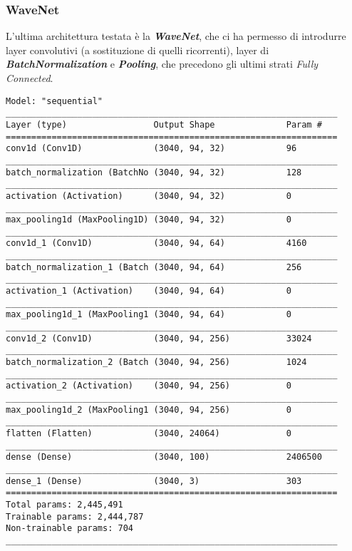 \subsubsection*{WaveNet}
L'ultima architettura testata è la \textit{\textbf{WaveNet}}\cite{DBLP:journals/corr/OordDZSVGKSK16}, che ci ha permesso di introdurre layer convolutivi (a sostituzione di quelli ricorrenti), layer di \textit{\textbf{BatchNormalization}} e \textit{\textbf{Pooling}}, che precedono gli ultimi strati \textit{Fully Connected}.
\begin{lstlisting}[style=arch]
Model: "sequential"
_________________________________________________________________
Layer (type)                 Output Shape              Param #   
=================================================================
conv1d (Conv1D)              (3040, 94, 32)            96        
_________________________________________________________________
batch_normalization (BatchNo (3040, 94, 32)            128       
_________________________________________________________________
activation (Activation)      (3040, 94, 32)            0         
_________________________________________________________________
max_pooling1d (MaxPooling1D) (3040, 94, 32)            0         
_________________________________________________________________
conv1d_1 (Conv1D)            (3040, 94, 64)            4160      
_________________________________________________________________
batch_normalization_1 (Batch (3040, 94, 64)            256       
_________________________________________________________________
activation_1 (Activation)    (3040, 94, 64)            0         
_________________________________________________________________
max_pooling1d_1 (MaxPooling1 (3040, 94, 64)            0         
_________________________________________________________________
conv1d_2 (Conv1D)            (3040, 94, 256)           33024     
_________________________________________________________________
batch_normalization_2 (Batch (3040, 94, 256)           1024      
_________________________________________________________________
activation_2 (Activation)    (3040, 94, 256)           0         
_________________________________________________________________
max_pooling1d_2 (MaxPooling1 (3040, 94, 256)           0         
_________________________________________________________________
flatten (Flatten)            (3040, 24064)             0         
_________________________________________________________________
dense (Dense)                (3040, 100)               2406500   
_________________________________________________________________
dense_1 (Dense)              (3040, 3)                 303       
=================================================================
Total params: 2,445,491
Trainable params: 2,444,787
Non-trainable params: 704
_________________________________________________________________
\end{lstlisting}
